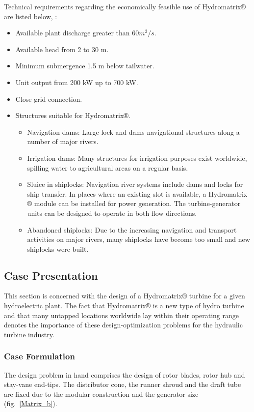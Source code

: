 Technical requirements regarding the economically feasible use of Hydromatrix$\circledR$ are listed below, \cite{matrix,matrix_2}: 
\begin{itemize}
\item Available plant discharge greater than $60 m^3/s$. 
\item Available head from 2 to 30 m. 
\item Minimum submergence 1.5 m below tailwater.
\item Unit output from 200 kW up to 700 kW.
\item Close grid connection.
\item Structures suitable for Hydromatrix$\circledR$. 
\begin{itemize}
	\item Navigation dams: Large lock and dams navigational structures along a number of major rivers. 
	\item Irrigation dams: Many structures for irrigation purposes exist worldwide, spilling water to agricultural areas on a regular basis.
	\item Sluice in shiplocks: Navigation river systems include dams and locks for ship transfer. In places where an existing slot is available, a Hydromatrix$\circledR$ module can be installed for power generation. The turbine-generator units can be designed to operate in both flow directions. 
	\item Abandoned shiplocks: Due to the increasing navigation and transport activities on major rivers, many shiplocks have become too small and new shiplocks were built.
\end{itemize}
\end{itemize}

\subsection{Case Presentation}
This section is concerned with the design of a  Hydromatrix$\circledR$ turbine for a given hydroelectric plant. The fact that Hydromatrix$\circledR$ is a new type of hydro turbine and that many untapped locations worldwide lay within their operating range denotes the importance of these design-optimization problems for the hydraulic turbine industry.    


\subsubsection{Case Formulation}
The design problem in hand comprises the design of rotor blades, rotor hub and stay-vane end-tips. The distributor cone, the runner shroud and the draft tube are fixed due to the modular construction and the generator size (fig.\ \ref{Matrix_b}).     


